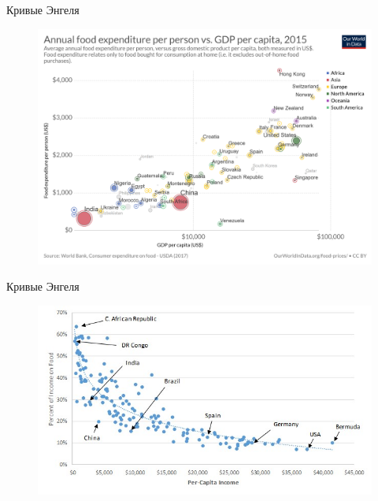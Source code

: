 \documentclass{beamer}
\begin{document}
\begin{frame}{Кривые Энгеля}

\begin{figure}[hbt]
\centering
\includegraphics[width=1 \textwidth]{worldbank.png}
\end{figure}

\end{frame}

\begin{frame}{Кривые Энгеля}

\begin{figure}[hbt]
\centering
\includegraphics[width=1 \textwidth]{worldbank2.jpeg}
\end{figure}

\end{frame}
\end{document}
